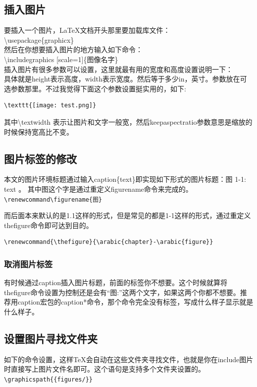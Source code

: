 \documentclass[12pt,oneside]{book}
\begin{document}
\begin{common-format}
\section{插入图片}
要插入一个图片，\LaTeX 文档开头那里要加载库文件：\\
\textbackslash usepackage\{graphicx\}\\
然后在你想要插入图片的地方输入如下命令：\\
\textbackslash includegraphics [scale=1]\{图像名字\}\\
插入图片有很多参数可以设置，这里就最有用的宽度和高度设置说明一下：\\
具体就是height表示高度，width表示宽度。然后等于多少in，英寸。参数放在可选参数那里。不过我觉得下面这个参数设置挺实用的，如下:
\begin{Verbatim}
\texttt{[image: test.png]}
\end{Verbatim}
其中\textbackslash textwidth 表示让图片和文字一般宽，然后keepaspectratio参数意思是缩放的时候保持宽高比不变。

\subsection{图片标签的修改}
\label{sec:图片标签的修改}
本文的图片环境标题通过输入caption\{text\}即实现如下形式的图片标题：图 1-1: text  。
其中图这个字是通过重定义figurename命令来完成的。\\
\verb+\renewcommand\figurename{图}+

而后面本来默认的是1.1这样的形式，但是常见的都是1-1这样的形式，通过重定义thefigure命令即可达到目的。
\begin{Verbatim}
\renewcommand{\thefigure}{\arabic{chapter}-\arabic{figure}}
\end{Verbatim}

\subsubsection{取消图片标签}
有时候通过caption插入图片标题，前面的标签你不想要。这个时候就算将thefigure命令设置为控制还是会有“图:”这两个文字，如果这两个你都不想要。推荐用caption宏包的caption*命令，那个命令完全没有标签，写成什么样子显示就是什么样子。


\subsection{设置图片寻找文件夹}
如下的命令设置，这样\TeX 会自动在这些文件夹寻找文件，也就是你在include图片时直接写上图片文件名即可。这个语句是支持多个文件夹设置的。
\verb+\graphicspath{{figures/}}+




\end{common-format}
\end{document}
